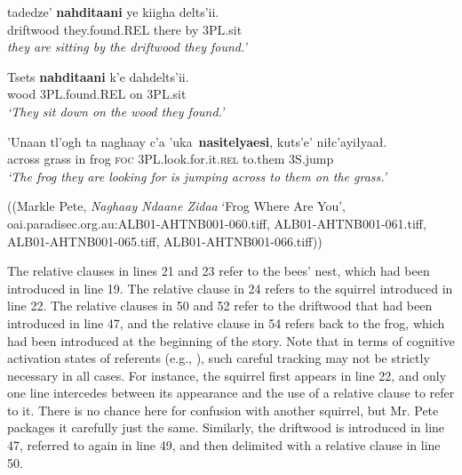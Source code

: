 \begin{exe}
\begin{xlistn}
 \gll 			tadedze’	\textbf{nahditaani}	ye kiigha	delts’ii.\\
driftwood	they.found.REL	there by		3PL.sit\\
\glt \textit{they are sitting by the driftwood they found.’}

\sn	{[...]}

 \gll 			Tsets 	\textbf{nahditaani} 		k’e	dahdelts’ii.\\
wood	3PL.found.REL		on	3PL.sit\\
\glt	\textit{‘They sit down on the wood they found.’}

\sn	{[...]}

 \gll 			’Unaan		tl’ogh	ta 		naghaay	c’a	’uka~\textbf{nasitelyaesi}, 	 kuts’e’		niłc’ayiłyaał.\\
across		grass	in		frog			\textsc{foc} 	3PL.look.for.it.\textsc{rel}	to.them		3S.jump		\\
\glt \textit{‘The frog they are looking for is jumping across to them on the grass.’}

\end{xlistn}
\begin{flushright}
((Markle Pete, \textit{Naghaay Ndaane Zidaa} ‘Frog Where Are You’,\\
oai.paradisec.org.au:ALB01-AHTNB001-060.tiff, ALB01-AHTNB001-061.tiff,\\
ALB01-AHTNB001-065.tiff, ALB01-AHTNB001-066.tiff))
\end{flushright}
\end{exe}



The relative clauses in lines 21 and 23 refer to the bees’ nest, which had been introduced in line 19. The relative clause in 24 refers to the squirrel introduced in line 22. The relative clauses in 50 and 52 refer to the driftwood that had been introduced in line 47, and the relative clause in 54 refers back to the frog, which had been introduced at the beginning of the story. Note that in terms of cognitive activation states of referents (e.g., \citealt{Chafe1994}), such careful tracking may not be strictly necessary in all cases. For instance, the squirrel first appears in line 22, and only one line intercedes between its appearance and the use of a relative clause to refer to it. There is no chance here for confusion with another squirrel, but Mr. Pete packages it carefully just the same. Similarly, the driftwood is introduced in line 47, referred to again in line 49, and then delimited with a relative clause in line 50.

